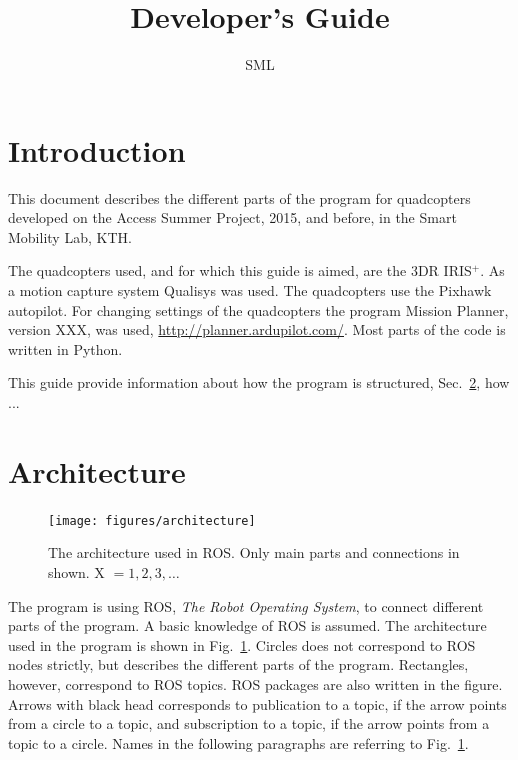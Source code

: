 \documentclass[titlepage,11pt,a4paper]{article}
\title{Developer's Guide} \author{SML}
\begin{document}
\maketitle \tableofcontents
\newpage

\section{Introduction}
This document describes the different parts of the program for
quadcopters developed on the Access Summer Project, 2015, and before,
in the Smart Mobility Lab, KTH.

The quadcopters used, and for which this guide is aimed, are the 3DR
IRIS$^+$. As a motion capture system Qualisys was used. The
quadcopters use the Pixhawk autopilot. For changing settings of the
quadcopters the program Mission Planner, version XXX, was used,
\url{http://planner.ardupilot.com/}. Most parts of the code is written
in Python.

This guide provide information about how the program is structured,
Sec.~\ref{sec:architecture}, how ...


\section{Architecture}
\label{sec:architecture}

\begin{figure}[h!]                                                               
  \centering \texttt{[image: figures/architecture]}
  \caption{The architecture used in ROS. Only main parts and
    connections in shown. X $= 1, 2, 3, \dots$}
  \label{fig:architecture}                                                              
\end{figure}

The program is using ROS, \textit{The Robot Operating System}, to
connect different parts of the program. A basic knowledge of ROS is
assumed. The architecture used in the program is shown in
Fig.~\ref{fig:architecture}. Circles does not correspond to ROS nodes
strictly, but describes the different parts of the
program. Rectangles, however, correspond to ROS topics. ROS packages
are also written in the figure. Arrows with black head corresponds to
publication to a topic, if the arrow points from a circle to a topic,
and subscription to a topic, if the arrow points from a topic to a
circle. Names in the following paragraphs are referring to
Fig.~\ref{fig:architecture}.
\end{document}
